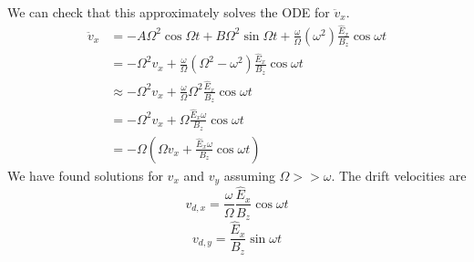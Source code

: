 \documentclass[answers]{exam}
\begin{document}
\begin{questions}
\begin{solution}
    We can check that this approximately solves the ODE for $\ddot v_x$.
    \begin{align*}
        \ddot v_x &= -A\Omega^2\cos\Omega t + B\Omega^2\sin\Omega t + \frac{\omega}{\Omega} (\omega^2) \frac{\hat E_x}{B_z}\cos\omega t \\
                  &= -\Omega^2v_x + \frac{\omega}{\Omega} (\Omega^2 - \omega^2) \frac{\hat E_x}{B_z}\cos\omega t \\
                  &\approx -\Omega^2 v_x + \frac{\omega}{\Omega} \Omega^2 \frac{\hat E_x}{B_z}\cos\omega t \\
                  &= -\Omega^2 v_x + \Omega \frac{\hat E_x\omega}{B_z}\cos\omega t \\
                  &= -\Omega\left(\Omega v_x + \frac{\hat E_x\omega}{B_z}\cos\omega t\right)
    \end{align*}
    We have found solutions for $v_x$ and $v_y$ assuming $\Omega >> \omega$. The drift velocities are
    $$v_{d,x} = \frac{\omega}{\Omega} \frac{\hat E_x}{B_z}\cos\omega t$$
    $$v_{d,y} = \frac{\hat E_x}{B_z}\sin\omega t$$
\end{solution}


\end{questions}
\end{document}
